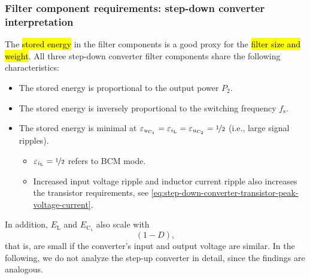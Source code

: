 \begin{frame}
    \frametitle{Filter component requirements: step-down converter interpretation}
    The \hl{stored energy} in the filter components is a good proxy for the \hl{filter size and weight}. \onslide<+->All three step-down converter filter components share the following characteristics:
    \begin{itemize}
        \item<+-> The stored energy is proportional to the output power $P_2$.
        \item<+-> The stored energy is inversely proportional to the switching frequency $f_\mathrm{s}$.
        \item<+-> The stored energy is minimal at $\varepsilon_{u_\mathrm{C_1}} = \varepsilon_{i_\mathrm{L}} = \varepsilon_{u_\mathrm{C_2}} = \nicefrac{1}{2}$ (i.e., large signal ripples).
        \begin{itemize}
            \item<+-> $\varepsilon_{i_\mathrm{L}}=\nicefrac{1}{2}$ refers to BCM mode.
            \item<+-> Increased input voltage ripple and inductor current ripple also increases the transistor requirements, see \eqref{eq:step-down-converter-transistor-peak-voltage-current}.
        \end{itemize}
    \end{itemize}\onslide<+->
    In addition, $E_\mathrm{L}$ and $E_\mathrm{C_1}$ also scale with $$(1-D),$$ that is, are small if the converter's input and output voltage are similar. In the following, we do not analyze the step-up converter in detail, since the findings are analogous.    
\end{frame}



